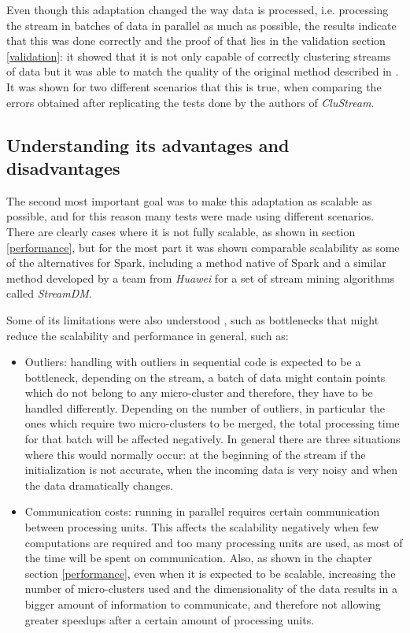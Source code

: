 \documentclass{llncs}
\begin{document}
Even though this adaptation changed the way data is processed, i.e. processing the stream in batches of data in parallel as much as possible, the results indicate that this was done correctly and the proof of that lies in the validation section \ref{validation}: it showed that it is not only capable of correctly clustering streams of data but it was able to match the quality of the original method described in \cite{clustreamOrig}. It was shown for two different scenarios that this is true, when comparing the errors obtained after replicating the tests done by the authors of \textit{CluStream}.

\subsection{Understanding its advantages and disadvantages}

The second most important goal was to make this adaptation as scalable as possible, and for this reason many tests were made using different scenarios. There are clearly cases where it is not fully scalable, as shown in section \ref{performance}, but for the most part it was shown comparable scalability as some of the alternatives for Spark, including a method native of Spark and a similar method developed by a team from \textit{Huawei} for a set of stream mining algorithms called \textit{StreamDM}.

Some of its limitations were also understood , such as bottlenecks that might reduce the scalability and performance in general, such as:

\begin{itemize}
 \item Outliers: handling with outliers in sequential code is expected to be a bottleneck, depending on the stream, a batch of data might contain points which do not belong to any micro-cluster and therefore, they have to be handled differently. Depending on the number of outliers, in particular the ones which require two micro-clusters to be merged, the total processing time for that batch will be affected negatively. In general there are three situations where this would normally occur: at the beginning of the stream if the initialization is not accurate, when the incoming data is very noisy and when the data dramatically changes.
 \item Communication costs: running in parallel requires certain communication between processing units. This affects the scalability negatively when few computations are required and too many processing units are used, as most of the time will be spent on communication. Also, as shown in the chapter section \ref{performance}, even when it is expected to be scalable, increasing the number of micro-clusters used and the dimensionality of the data results in a bigger amount of information to communicate, and therefore not allowing greater speedups after a certain amount of processing units. 
\end{itemize}
\end{document}
